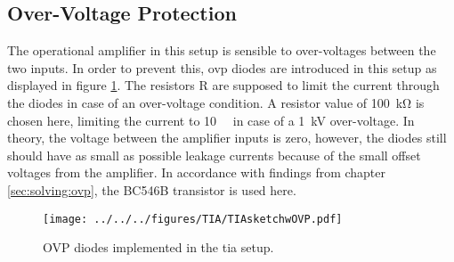 \subsection*{Over-Voltage Protection}
\label{sec:tia:ovp}
The operational amplifier in this setup is sensible to over-voltages between the two inputs. In order to prevent this, \ac{ovp} diodes are introduced in this setup as displayed in figure \ref{fig:tia:ovp}. The resistors R are supposed to limit the current through the diodes in case of an over-voltage condition. A resistor value of \SI{100}{\kilo\ohm} is chosen here, limiting the current to \SI{10}{\milli\amp} in case of a \SI{1}{\kilo\volt} over-voltage.
In theory, the voltage between the amplifier inputs is zero, however, the diodes still should have as small as possible leakage currents because of the small offset voltages from the amplifier. In accordance with findings from chapter \ref{sec:solving:ovp}, the BC546B transistor is used here.
\begin{figure}
	\centering
	\texttt{[image: ../../../figures/TIA/TIAsketchwOVP.pdf]}
	\caption{OVP diodes implemented in the \ac{tia} setup.}
	\label{fig:tia:ovp}
\end{figure}
